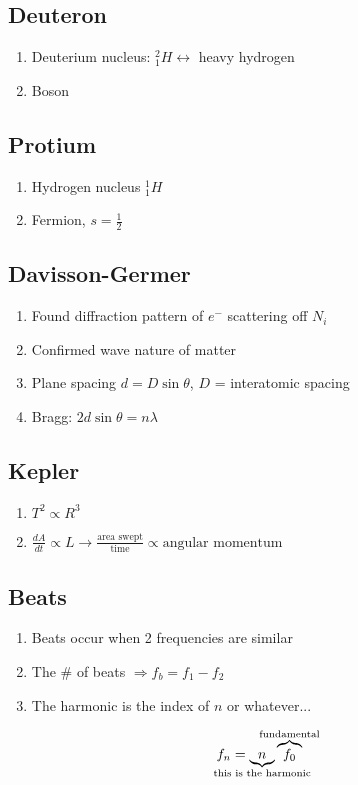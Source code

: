 \documentclass[10pt,letter]{article}
\begin{document}
\subsection{Deuteron}
\begin{enumerate}
    \item Deuterium nucleus: $^2_1H \leftrightarrow $ heavy hydrogen 
    \item Boson
\end{enumerate}

\subsection{Protium}
\begin{enumerate}
    \item Hydrogen nucleus $^1_1H$
    \item Fermion, $s=\frac{1}{2}$
\end{enumerate}

\subsection{Davisson-Germer}
\begin{enumerate}
    \item Found diffraction pattern of $e^-$ scattering off $N_i$
    \item Confirmed wave nature of matter
    \item Plane spacing  $d = D\sin \theta$, $D$ = interatomic spacing
    \item Bragg: $2d\sin \theta = n\lambda$
\end{enumerate}

\subsection{Kepler}
\begin{enumerate}
    \item $T^2 \propto R^3$
    \item $\frac{dA}{dt} \propto L \rightarrow \frac{\textrm{area swept}}{\textrm{time}} \propto \textrm{angular momentum}$
\end{enumerate}

\subsection{Beats}
\begin{enumerate}
    \item Beats occur when 2 frequencies are similar
    \item The \# of beats $\Rightarrow f_b = f_1 - f_2$ 
    \item The harmonic is the index of $n$ or whatever...
\end{enumerate}
\begin{equation}
 f_n = \underbrace{n}_{\mathclap{\textrm{this is the harmonic}}}\overbrace{f_0}^{\mathclap{\textrm{fundamental}}}
\end{equation}
\end{document}

